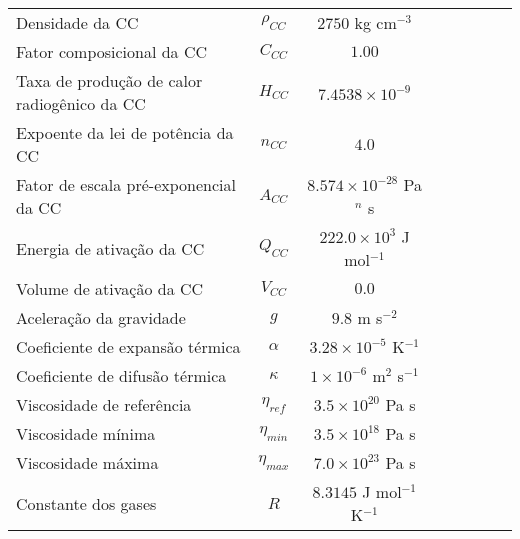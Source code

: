 \begin{center}
\begin{longtable}{lccccccc}
        Densidade da CC & $\rho_{CC}$ & $2750$ kg cm$^{-3}$ \\
        Fator composicional da CC & $C_{CC}$ & $1.00$ \\
        Taxa de produção de calor radiogênico da CC & $H_{CC}$ & $7.4538\times10^{-9}$ \\
        Expoente da lei de potência da CC & $n_{CC}$ & $4.0$ \\
        Fator de escala pré-exponencial da CC & $A_{CC}$ & $8.574\times10^{-28}$ Pa$^{n}$ s \\
        Energia de ativação da CC & $Q_{CC}$ & $222.0\times10^{3}$ J mol$^{-1}$ \\
        Volume de ativação da CC & $V_{CC}$ & $0.0$ \\

        Aceleração da gravidade & $g$ & $9.8$ m s$^{-2}$ \\
        Coeficiente de expansão térmica & $\alpha$ & $3.28\times10^{-5}$ K$^{-1}$ \\
        Coeficiente de difusão térmica & $\kappa$ & $1\times10^{-6}$ m$^2$ s$^{-1}$ \\

        Viscosidade de referência & $\eta_{ref}$ & $3.5 \times 10^{20}$ Pa s \\
        Viscosidade mínima & $\eta_{min}$ & $3.5 \times 10^{18}$ Pa s \\
        Viscosidade máxima & $\eta_{max}$ & $7.0 \times 10^{23}$ Pa s \\
        Constante dos gases & $R$ & $8.3145$ J mol$^{-1}$ K$^{-1}$ \\


\end{longtable}
\end{center}

